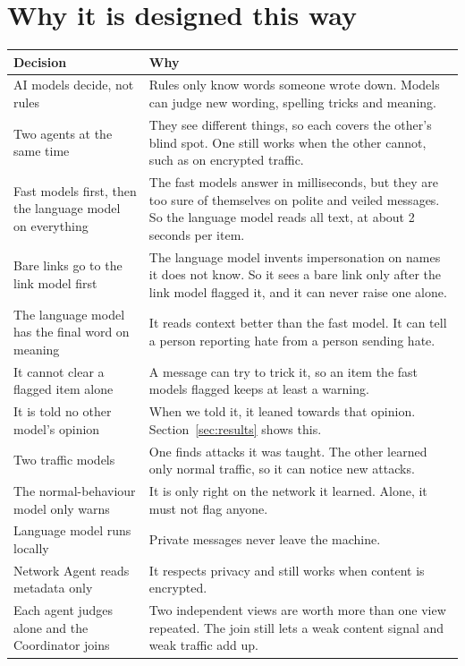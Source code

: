 \documentclass[11pt,a4paper]{article}
\newcommand{\need}[1][10]{\Needspace{#1\baselineskip}}
\begin{document}
\section{Why it is designed this way}

\need[20]
\begin{center}
\begin{tabularx}{\linewidth}{P{4.2cm}Y}
\toprule
\textbf{Decision} & \textbf{Why} \\
\midrule
AI models decide, not rules & Rules only know words someone wrote down. Models can judge new wording, spelling tricks and meaning. \\
Two agents at the same time & They see different things, so each covers the other's blind spot. One still works when the other cannot, such as on encrypted traffic. \\
Fast models first, then the language model on everything & The fast models answer in milliseconds, but they are too sure of themselves on polite and veiled messages. So the language model reads all text, at about 2 seconds per item. \\
Bare links go to the link model first & The language model invents impersonation on names it does not know. So it sees a bare link only after the link model flagged it, and it can never raise one alone. \\
The language model has the final word on meaning & It reads context better than the fast model. It can tell a person reporting hate from a person sending hate. \\
It cannot clear a flagged item alone & A message can try to trick it, so an item the fast models flagged keeps at least a warning. \\
It is told no other model's opinion & When we told it, it leaned towards that opinion. Section~\ref{sec:results} shows this. \\
Two traffic models & One finds attacks it was taught. The other learned only normal traffic, so it can notice new attacks. \\
The normal-behaviour model only warns & It is only right on the network it learned. Alone, it must not flag anyone. \\
Language model runs locally & Private messages never leave the machine. \\
Network Agent reads metadata only & It respects privacy and still works when content is encrypted. \\
Each agent judges alone and the Coordinator joins & Two independent views are worth more than one view repeated. The join still lets a weak content signal and weak traffic add up. \\

\end{tabularx}
\end{center}
\end{document}
